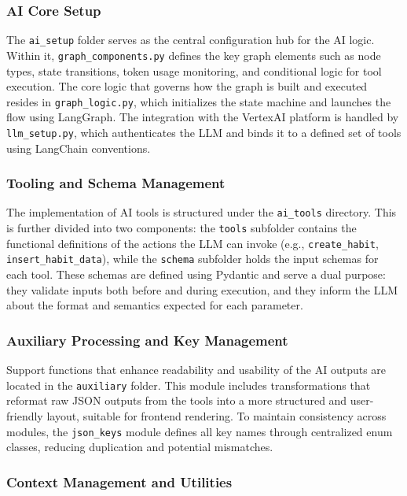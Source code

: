 \documentclass{article}
\begin{document}
\subsubsection{AI Core Setup}

The \texttt{ai\_setup} folder serves as the central configuration hub for the AI logic. Within it, \texttt{graph\_components.py} defines the key graph elements such as node types, state transitions, token usage monitoring, and conditional logic for tool execution. The core logic that governs how the graph is built and executed resides in \texttt{graph\_logic.py}, which initializes the state machine and launches the flow using LangGraph. The integration with the VertexAI platform is handled by \texttt{llm\_setup.py}, which authenticates the LLM and binds it to a defined set of tools using LangChain conventions.

\subsubsection{Tooling and Schema Management}

The implementation of AI tools is structured under the \texttt{ai\_tools} directory. This is further divided into two components: the \texttt{tools} subfolder contains the functional definitions of the actions the LLM can invoke (e.g., \texttt{create\_habit}, \texttt{insert\_habit\_data}), while the \texttt{schema} subfolder holds the input schemas for each tool. These schemas are defined using Pydantic and serve a dual purpose: they validate inputs both before and during execution, and they inform the LLM about the format and semantics expected for each parameter.

\subsubsection{Auxiliary Processing and Key Management}

Support functions that enhance readability and usability of the AI outputs are located in the \texttt{auxiliary} folder. This module includes transformations that reformat raw JSON outputs from the tools into a more structured and user-friendly layout, suitable for frontend rendering. To maintain consistency across modules, the \texttt{json\_keys} module defines all key names through centralized enum classes, reducing duplication and potential mismatches.

\subsubsection{Context Management and Utilities}
\end{document}
